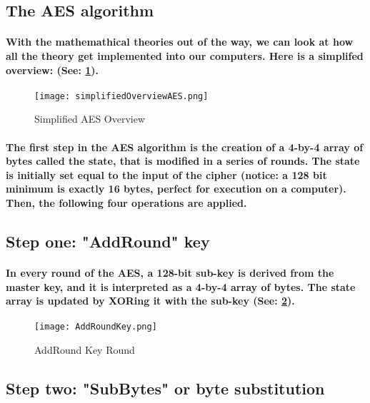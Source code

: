 \subsection{The AES algorithm}

\paragraph{With the mathemathical theories out of the way, we can look at how all the theory get implemented into our computers. Here is a simplifed overview: (See: \ref{fig: AESovereview}).}


\begin{figure}[H]
\centering
\texttt{[image: simplifiedOverviewAES.png]}
\caption{\label{fig: AESovereview} Simplified AES Overview}\cite[Webpage]{Crawford}
\end{figure}


\paragraph{The first step in the AES algorithm is the creation of a 4-by-4 array of bytes called the state, that is modified in a series of rounds. The state is initially set equal to the input of the cipher (notice: a 128 bit minimum is exactly 16 bytes, perfect for execution on a computer). Then, the following four operations are applied.}\cite[p. 186]{Katz}

\subsection{Step one: "AddRound" key}
\paragraph{In every round of the AES, a 128-bit sub-key is derived from the master key, and it is interpreted as a 4-by-4 array of bytes. The state array is updated by XORing it with the sub-key (See: \ref{fig: AddRoundKey}).}\cite[p. 186]{Katz}

\begin{figure}[H]
\centering
\texttt{[image: AddRoundKey.png]}
\caption{\label{fig: AddRoundKey} AddRound Key Round}\cite[Webpage]{Crawford}
\end{figure}


\subsection{Step two: "SubBytes" or byte substitution}
